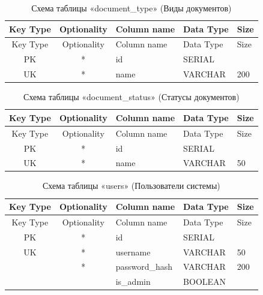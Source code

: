 \begin{xltabular}{\textwidth}{|c|c|l|l|X|}
	\caption{Схема таблицы «document\_type» (Виды документов)\label{tab:document_type}}\\ \hline
	\centrow Key Type & \centrow Optionality & \centrow Column name & \centrow Data Type & \centrow Size \\ \hline
	\endfirsthead
	\centrow Key Type & \centrow Optionality & \centrow Column name & \centrow Data Type & \centrow Size \\ \hline
	\finishhead
	PK & * & id & SERIAL & \\ \hline
	UK & * & name & VARCHAR & 200 \\ \hline
\end{xltabular}

\begin{xltabular}{\textwidth}{|c|c|l|l|X|}
	\caption{Схема таблицы «document\_status» (Статусы документов)\label{tab:document_status}}\\ \hline
	\centrow Key Type & \centrow Optionality & \centrow Column name & \centrow Data Type & \centrow Size \\ \hline
	\endfirsthead
	\centrow Key Type & \centrow Optionality & \centrow Column name & \centrow Data Type & \centrow Size \\ \hline
	\finishhead
	PK & * & id & SERIAL & \\ \hline
	UK & * & name & VARCHAR & 50 \\ \hline
\end{xltabular}

\begin{xltabular}{\textwidth}{|c|c|l|l|X|}
	\caption{Схема таблицы «users» (Пользователи системы)\label{tab:users}}\\ \hline
	\centrow Key Type & \centrow Optionality & \centrow Column name & \centrow Data Type & \centrow Size \\ \hline
	\endfirsthead
	\centrow Key Type & \centrow Optionality & \centrow Column name & \centrow Data Type & \centrow Size \\ \hline
	\finishhead
	PK & * & id & SERIAL & \\ \hline
	UK & * & username & VARCHAR & 50 \\ \hline
	& * & password\_hash & VARCHAR & 200 \\ \hline
	& & is\_admin & BOOLEAN & \\ \hline
\end{xltabular}